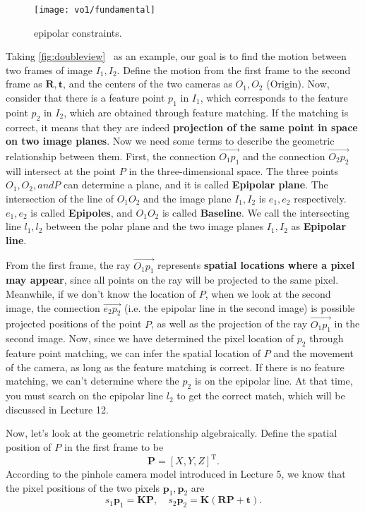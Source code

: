 \begin{figure}[!htp]
	\centering
	\texttt{[image: vo1/fundamental]}
	\caption{epipolar constraints.}
	\label{fig:doubleview}
\end{figure}

Taking \autoref{fig:doubleview}~ as an example, our goal is to find the motion between two frames of image $I_{1}, I_{2}$. Define the motion from the first frame to the second frame as $\mathbf{R}, \mathbf{t}$, and the centers of the two cameras as $O_{1}, O_{2}$ (Origin). Now, consider that there is a feature point $p_{1}$ in $I_{1}$, which corresponds to the feature point $p_{2}$ in $I_{2}$, which are obtained through feature matching. If the matching is correct, it means that they are indeed \textbf{projection of the same point in space on two image planes}. Now we need some terms to describe the geometric relationship between them. First, the connection $\overrightarrow{O_{1}p_{1}}$ and the connection $\overrightarrow{O_{2}p_{2}}$ will intersect at the point $P$ in the three-dimensional space. The three points $O_{1}, O_{2}, and P$ can determine a plane, and it is called \textbf{Epipolar plane}. The intersection of the line of $O_{1}O_{2}$ and the image plane $I_{1}, I_{2}$ is $e_{1}, e_{2}$ respectively. $e_{1}, e_{2}$ is called \textbf{Epipoles}, and $O_{1}O_{2}$ is called \textbf{Baseline}. We call the intersecting line $l_{1},l_{2}$ between the polar plane and the two image planes $I_{1}, I_{2}$ as \textbf{Epipolar line}.

From the first frame, the ray $\overrightarrow{O_1 p_1}$ represents \textbf{spatial locations where a pixel may appear}, since all points on the ray will be projected to the same pixel. Meanwhile, if we don’t know the location of $P$, when we look at the second image, the connection $\overrightarrow{e_2 p_2}$ (i.e. the epipolar line in the second image) is possible projected positions of the point $P$, as well as the projection of the ray $\overrightarrow{O_1 p_1}$ in the second image. Now, since we have determined the pixel location of $p_2$ through feature point matching, we can infer the spatial location of $P$ and the movement of the camera, as long as the feature matching is correct. If there is no feature matching, we can't determine where the $p_2$ is on the epipolar line. At that time, you must search on the epipolar line $l_2$ to get the correct match, which will be discussed in Lecture 12.

Now, let's look at the geometric relationship algebraically. Define the spatial position of $P$ in the first frame to be
\[
\mathbf{P}=[X,Y,Z]^\mathrm{T}.
\]
According to the pinhole camera model introduced in Lecture 5, we know that the pixel positions of the two pixels $\mathbf{p}_1,\mathbf{p}_2$ are
\begin{equation}
s_1 {\mathbf{p}_1} = \mathbf{KP},\quad s_2 \mathbf{p}_2 = \mathbf{K}\left( \mathbf{RP + t} \right).
\end{equation}

